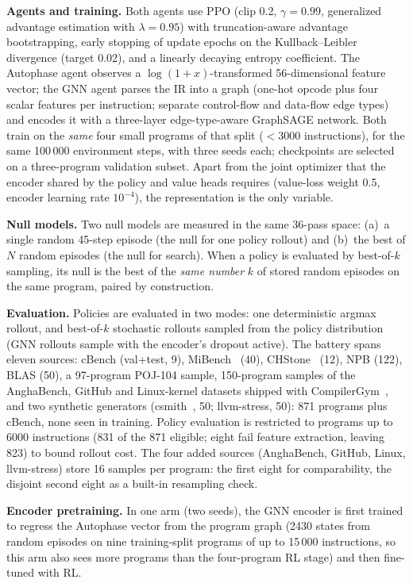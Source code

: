 \documentclass[conference,a4paper]{IEEEtran}
\begin{document}
\textbf{Agents and training.} Both agents use PPO (clip 0.2,
$\gamma{=}0.99$, generalized advantage estimation with
$\lambda{=}0.95$) with truncation-aware advantage bootstrapping, early
stopping of update epochs on the Kullback--Leibler divergence (target
0.02), and a linearly decaying entropy coefficient. The Autophase agent
observes a $\log(1{+}x)$-transformed 56-dimensional feature vector; the
GNN agent parses the IR into a graph (one-hot opcode plus four scalar
features per instruction; separate control-flow and data-flow edge
types) and encodes it with a three-layer edge-type-aware GraphSAGE
network. Both train on the \emph{same} four small programs of that split
($<$3000 instructions), for the same 100\,000 environment steps, with
three seeds each; checkpoints are selected on a three-program validation
subset. Apart from the joint optimizer that the encoder shared by the
policy and value heads requires (value-loss weight 0.5, encoder
learning rate $10^{-4}$), the
representation is the only variable.

\textbf{Null models.} Two null models are measured in the same 36-pass
space: (a)~a single random 45-step episode (the null for one policy
rollout) and (b)~the best of $N$ random episodes (the null for search).
When a policy is evaluated by best-of-$k$ sampling, its null is the best
of the \emph{same number} $k$ of stored random episodes on the same program, paired by construction.

\textbf{Evaluation.} Policies are evaluated in two modes: one
deterministic argmax rollout, and best-of-$k$ stochastic rollouts
sampled from the policy distribution (GNN rollouts sample with the
encoder's dropout active). The battery spans eleven sources: cBench (val{+}test, 9),
MiBench~\cite{mibench} (40), CHStone~\cite{chstone} (12), NPB (122),
BLAS (50), a 97-program POJ-104 sample, 150-program samples of the
AnghaBench, GitHub and Linux-kernel datasets shipped with
CompilerGym~\cite{compilergym}, and two synthetic generators
(csmith~\cite{csmith}, 50; llvm-stress, 50): 871 programs plus
cBench, none seen in training. Policy evaluation is restricted to
programs up to 6000 instructions (831 of the 871 eligible; eight fail
feature extraction, leaving 823) to bound rollout cost. The four added
sources (AnghaBench, GitHub, Linux, llvm-stress) store 16 samples per
program: the first eight for comparability, the disjoint second eight
as a built-in resampling check.

\textbf{Encoder pretraining.} In one arm (two seeds), the GNN encoder
is first trained to regress the Autophase vector from the program graph
(2430 states from random episodes on nine training-split programs of up
to 15\,000 instructions, so this arm also sees more programs than the
four-program RL stage) and then fine-tuned with RL.
\end{document}
